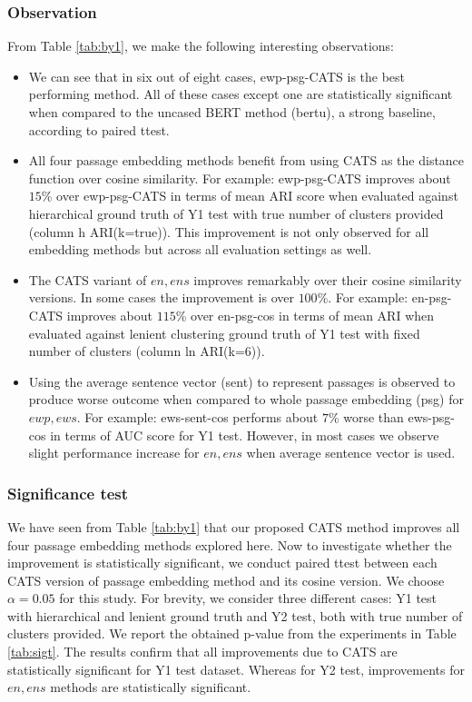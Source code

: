 \subsubsection{Observation} From Table \ref{tab:by1}, we make the following interesting observations:
\begin{itemize}
    \item We can see that in six out of eight cases, ewp-psg-CATS is the best performing method. All of these cases except one are statistically significant when compared to the uncased BERT method (bertu), a strong baseline, according to paired ttest.
    \item All four passage embedding methods benefit from using CATS as the distance function over cosine similarity. For example: ewp-psg-CATS improves about $15$\% over ewp-psg-CATS in terms of mean ARI score when evaluated against hierarchical ground truth of Y1 test with true number of clusters provided (column h ARI(k=true)). This improvement is not only observed for all embedding methods but across all evaluation settings as well.
    \item The CATS variant of $en, ens$ improves remarkably over their cosine similarity versions. In some cases the improvement is over $100$\%. For example: en-psg-CATS improves about $115$\% over en-psg-cos in terms of mean ARI when evaluated against lenient clustering ground truth of Y1 test with fixed number of clusters (column ln ARI(k=6)).
    \item Using the average sentence vector (sent) to represent passages is observed to produce worse outcome when compared to whole passage embedding (psg) for $ewp, ews$. For example: ews-sent-cos performs about $7$\% worse than ews-psg-cos in terms of AUC score for Y1 test. However, in most cases we observe slight performance increase for $en, ens$ when average sentence vector is used.
\end{itemize}


\subsubsection{Significance test} We have seen from Table \ref{tab:by1} that our proposed CATS method improves all four passage embedding methods explored here. Now to investigate whether the improvement is statistically significant, we conduct paired ttest between each CATS version of passage embedding method and its cosine version. We choose $\alpha = 0.05$ for this study. For brevity, we consider three different cases: Y1 test with hierarchical and lenient ground truth and Y2 test, both with true number of clusters provided. We report the obtained p-value from the experiments in Table \ref{tab:sigt}. The results confirm that all improvements due to CATS are statistically significant for Y1 test dataset. Whereas for Y2 test, improvements for $en, ens$ methods are statistically significant.


